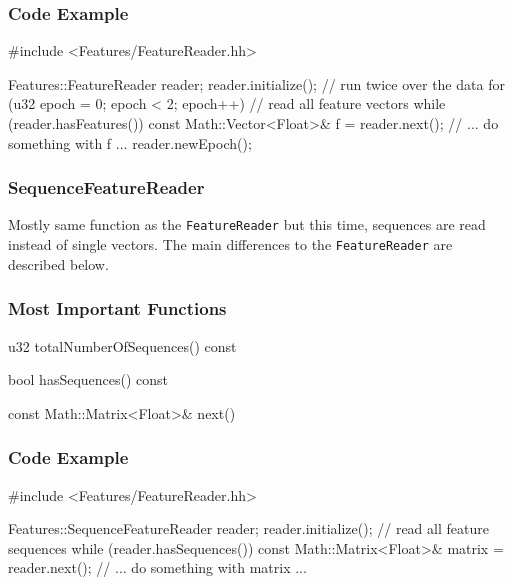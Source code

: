 \subsubsection*{Code Example}
\begin{code}
#include <Features/FeatureReader.hh>

Features::FeatureReader reader;
reader.initialize();
// run twice over the data
for (u32 epoch = 0; epoch < 2; epoch++) {
    // read all feature vectors
    while (reader.hasFeatures()) {
        const Math::Vector<Float>& f = reader.next();
        // ... do something with f ...
    }
    reader.newEpoch();
}
\end{code}

\subsubsection{SequenceFeatureReader}

Mostly same function as the \texttt{FeatureReader} but this time, sequences are read instead of single vectors. The main differences to the \texttt{FeatureReader} are described below.

\subsubsection*{Most Important Functions}

\begin{fdoc}{u32 totalNumberOfSequences() const}
\end{fdoc}

\begin{fdoc}{bool hasSequences() const}
\end{fdoc}

\begin{fdoc}{const Math::Matrix<Float>\& next()}
\end{fdoc}

\subsubsection*{Code Example}
\begin{code}
#include <Features/FeatureReader.hh>

Features::SequenceFeatureReader reader;
reader.initialize();
// read all feature sequences
while (reader.hasSequences()) {
    const Math::Matrix<Float>& matrix = reader.next();
    // ... do something with matrix ...
}
\end{code}

